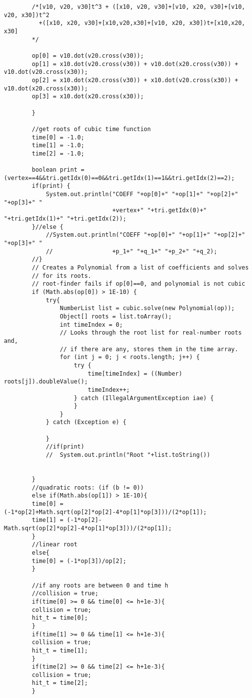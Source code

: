 \begin{lstlisting}
		/*[v10, v20, v30]t^3 + ([x10, v20, v30]+[v10, x20, v30]+[v10, v20, x30])t^2
		  +([x10, x20, v30]+[x10,v20,x30]+[v10, x20, x30])t+[x10,x20, x30]
		*/

		op[0] = v10.dot(v20.cross(v30));
		op[1] = x10.dot(v20.cross(v30)) + v10.dot(x20.cross(v30)) + v10.dot(v20.cross(x30));
		op[2] = x10.dot(x20.cross(v30)) + x10.dot(v20.cross(x30)) + v10.dot(x20.cross(x30));
		op[3] = x10.dot(x20.cross(x30));
				
	    }
		
	    //get roots of cubic time function
	    time[0] = -1.0;
	    time[1] = -1.0;
	    time[2] = -1.0;
		
		boolean print = (vertex==4&&tri.getIdx(0)==0&&tri.getIdx(1)==1&&tri.getIdx(2)==2);
		if(print) {
			System.out.println("COEFF "+op[0]+" "+op[1]+" "+op[2]+" "+op[3]+" "
							   +vertex+" "+tri.getIdx(0)+" "+tri.getIdx(1)+" "+tri.getIdx(2));
		}//else {
			//System.out.println("COEFF "+op[0]+" "+op[1]+" "+op[2]+" "+op[3]+" "
			//				   +p_1+" "+q_1+" "+p_2+" "+q_2);
		//}
	    // Creates a Polynomial from a list of coefficients and solves
	    // for its roots.
	    // root-finder fails if op[0]==0, and polynomial is not cubic
	    if (Math.abs(op[0]) > 1E-10) {
			try{
				NumberList list = cubic.solve(new Polynomial(op));
				Object[] roots = list.toArray();
				int timeIndex = 0;
				// Looks through the root list for real-number roots and,
				// if there are any, stores them in the time array.
				for (int j = 0; j < roots.length; j++) {
					try {
						time[timeIndex] = ((Number) roots[j]).doubleValue();
						timeIndex++;
					} catch (IllegalArgumentException iae) {
					}
				}
			} catch (Exception e) {
				
			}
			//if(print)
			//	System.out.println("Root "+list.toString())
				
		
	    }
	    //quadratic roots: (if (b != 0)) 
	    else if(Math.abs(op[1]) > 1E-10){
		time[0] = (-1*op[2]+Math.sqrt(op[2]*op[2]-4*op[1]*op[3]))/(2*op[1]);
		time[1] = (-1*op[2]-Math.sqrt(op[2]*op[2]-4*op[1]*op[3]))/(2*op[1]);
	    }
	    //linear root
	    else{
		time[0] = (-1*op[3])/op[2];
	    }
			
	    //if any roots are between 0 and time h
	    //collision = true;
	    if(time[0] >= 0 && time[0] <= h+1e-3){
		collision = true;
		hit_t = time[0];
	    }
	    if(time[1] >= 0 && time[1] <= h+1e-3){
		collision = true;
		hit_t = time[1];
	    }
	    if(time[2] >= 0 && time[2] <= h+1e-3){
		collision = true;
		hit_t = time[2];
	    }
		

\end{lstlisting}
